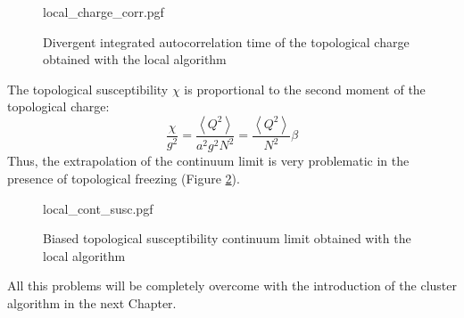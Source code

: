\begin{figure}[!htb]
    \centering
    {local_charge_corr.pgf}
    \caption{Divergent integrated autocorrelation time of the topological charge obtained with the local algorithm}
    \label{fig:local_charge_corr}
\end{figure}

The topological susceptibility $\chi$ is proportional to the second moment of the topological charge:
\[
    \frac{\chi}{g^2} = \frac{\left<Q^2\right>}{a^2g^2N^2} = \frac{\left<Q^2\right>}{N^2}\beta
\]
Thus, the extrapolation of the continuum limit is very problematic in the presence of topological freezing (Figure \ref{fig:local_cont_susc}).

\begin{figure}[!htb]
    \centering
    {local_cont_susc.pgf}
    \caption{Biased topological susceptibility continuum limit obtained with the local algorithm}
    \label{fig:local_cont_susc}
\end{figure}

All this problems will be completely overcome with the introduction of the cluster algorithm in the next Chapter.


